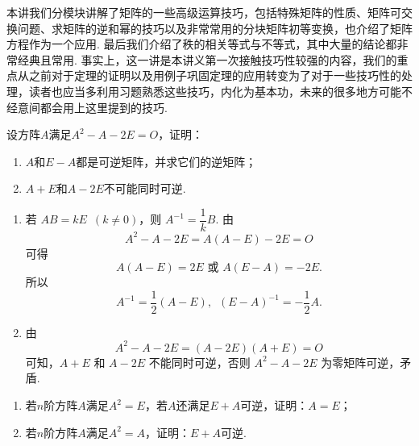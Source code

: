 \begin{summary}

    本讲我们分模块讲解了矩阵的一些高级运算技巧，包括特殊矩阵的性质、矩阵可交换问题、求矩阵的逆和幂的技巧以及非常常用的分块矩阵初等变换，也介绍了矩阵方程作为一个应用. 最后我们介绍了秩的相关等式与不等式，其中大量的结论都非常经典且常用. 事实上，这一讲是本讲义第一次接触技巧性较强的内容，我们的重点从之前对于定理的证明以及用例子巩固定理的应用转变为了对于一些技巧性的处理，读者也应当多利用习题熟悉这些技巧，内化为基本功，未来的很多地方可能不经意间都会用上这里提到的技巧.

\end{summary}

\begin{exercise}

    \begin{exgroup}
        \item 设方阵$A$满足$A^2-A-2E=O$，证明：
        \begin{enumerate}
            \item $A$和$E-A$都是可逆矩阵，并求它们的逆矩阵；

            \item $A+E$和$A-2E$不可能同时可逆.
        \end{enumerate}
        \begin{answer}
            \begin{enumerate}
                \item 若 $ AB = kE \enspace(k \neq 0) $，则 $ A^{-1} = \dfrac{1}{k} B $. 由
                      \[ A^2 - A - 2E = A(A - E) - 2E = O \]
                      可得
                      \[ A(A - E) = 2E \text{~或~} A(E - A) = -2E. \]
                      所以
                      \[ A^{-1} = \frac{1}{2}(A-E),\enspace (E - A)^{-1} = -\frac{1}{2}A. \]

                \item 由
                      \[  A^2 - A - 2E = (A - 2E)(A + E) = O \]
                      可知，$ A + E $ 和 $ A - 2E $ 不能同时可逆，否则 $ A^2 - A - 2E $ 为零矩阵可逆，矛盾.
            \end{enumerate}
        \end{answer}

        \item \begin{enumerate}
            \item 若$n$阶方阵$A$满足$A^2=E$，若$A$还满足$E+A$可逆，证明：$A=E$；
            \item 若$n$阶方阵$A$满足$A^2=A$，证明：$E+A$可逆.
        \end{enumerate}
        \begin{answer}


\end{answer}
\end{exgroup}
\end{exercise}

